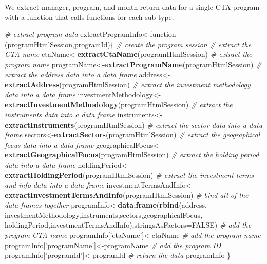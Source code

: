 \documentclass[]{article}
\newenvironment{Shaded}{\begin{snugshade}}{\end{snugshade}}
\newcommand{\KeywordTok}[1]{\textcolor[rgb]{0.13,0.29,0.53}{\textbf{{#1}}}}
\newcommand{\DataTypeTok}[1]{\textcolor[rgb]{0.13,0.29,0.53}{{#1}}}
\newcommand{\StringTok}[1]{\textcolor[rgb]{0.31,0.60,0.02}{{#1}}}
\newcommand{\CommentTok}[1]{\textcolor[rgb]{0.56,0.35,0.01}{\textit{{#1}}}}
\newcommand{\OtherTok}[1]{\textcolor[rgb]{0.56,0.35,0.01}{{#1}}}
\newcommand{\NormalTok}[1]{{#1}}
\begin{document}
We extract manager, program, and month return data for a single CTA
program with a function that calls functions for each sub-type.

\begin{Shaded}
\begin{Highlighting}[]
\CommentTok{# extract program data}
\NormalTok{extractProgramInfo<-function (programHtmlSession,programId)\{  }
  \CommentTok{# create the program session}
  \CommentTok{# extract the CTA name  }
  \NormalTok{ctaName<-}\KeywordTok{extractCtaName}\NormalTok{(programHtmlSession)}
  \CommentTok{# extract the program name}
  \NormalTok{programName<-}\KeywordTok{extractProgramName}\NormalTok{(programHtmlSession)}
  \CommentTok{# extract the address data into a data frame}
  \NormalTok{address<-}\KeywordTok{extractAddress}\NormalTok{(programHtmlSession)}
  \CommentTok{# extract the investment methodology data into a data frame}
  \NormalTok{investmentMethodology<-}\KeywordTok{extractInvestmentMethodology}\NormalTok{(programHtmlSession)}
  \CommentTok{# extract the instruments data into a data frame  }
  \NormalTok{instruments<-}\KeywordTok{extractInstruments}\NormalTok{(programHtmlSession)}
  \CommentTok{# extract the sector data into a data frame}
  \NormalTok{sectors<-}\KeywordTok{extractSectors}\NormalTok{(programHtmlSession)  }
  \CommentTok{# extract the geographical focus data into a data frame}
  \NormalTok{geographicalFocus<-}\KeywordTok{extractGeographicalFocus}\NormalTok{(programHtmlSession)}
  \CommentTok{# extract the holding period data into a data frame}
  \NormalTok{holdingPeriod<-}\KeywordTok{extractHoldingPeriod}\NormalTok{(programHtmlSession)}
  \CommentTok{# extract the investment terms and info data into a data frame}
  \NormalTok{investmentTermsAndInfo<-}\KeywordTok{extractInvestmentTermsAndInfo}\NormalTok{(programHtmlSession)}
  \CommentTok{# bind all of the data frames together}
  \NormalTok{programInfo<-}\KeywordTok{data.frame}\NormalTok{(}\KeywordTok{rbind}\NormalTok{(address,}
    \NormalTok{investmentMethodology,instruments,sectors,geographicalFocus,}
    \NormalTok{holdingPeriod,investmentTermsAndInfo),}\DataTypeTok{stringsAsFactors=}\OtherTok{FALSE}\NormalTok{)}
  \CommentTok{# add the program CTA name}
  \NormalTok{programInfo[}\StringTok{'ctaName'}\NormalTok{]<-ctaName}
  \CommentTok{# add the program name}
  \NormalTok{programInfo[}\StringTok{'programName'}\NormalTok{]<-programName}
  \CommentTok{# add the program ID}
  \NormalTok{programInfo[}\StringTok{'programId'}\NormalTok{]<-programId}
  \CommentTok{# return the data}
  \NormalTok{programInfo}
\NormalTok{\}}


\end{Highlighting}
\end{Shaded}
\end{document}
